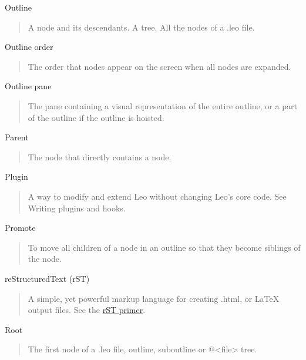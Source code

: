 \documentclass[a4paper,10pt,english]{sphinxmanual}
\begin{document}
Outline
\begin{quote}

A node and its descendants. A tree. All the nodes of a .leo file.
\end{quote}

Outline order
\begin{quote}

The order that nodes appear on the screen when all nodes are expanded.
\end{quote}

Outline pane
\begin{quote}

The pane containing a visual representation of the entire outline, or a part
of the outline if the outline is hoisted.
\end{quote}

Parent
\begin{quote}

The node that directly contains a node.
\end{quote}

Plugin
\begin{quote}

A way to modify and extend Leo without changing Leo's core code.
See Writing plugins and hooks.
\end{quote}

Promote
\begin{quote}

To move all children of a node in an outline so that they become siblings of
the node.
\end{quote}

reStructuredText (rST)
\begin{quote}

A simple, yet powerful markup language for creating .html, or LaTeX output
files. See the \href{http://docutils.sourceforge.net/docs/user/rst/quickstart.html}{rST primer}.
\end{quote}

Root
\begin{quote}

The first node of a .leo file, outline, suboutline or @\textless{}file\textgreater{} tree.
\end{quote}
\end{document}
